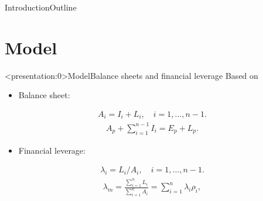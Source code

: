 \documentclass{beamer}
\begin{document}
\begin{frame}{Introduction}{Outline}
  \tableofcontents
\end{frame}
\section{Model}
\begin{frame}<presentation:0>{Model}{Balance sheets and financial leverage}
Based on \cite*{huizinga2008capital}
\begin{itemize}
	\item  Balance sheet:
\end{itemize}
\begin{equation}
\begin{aligned}
A_i=I_i+L_i, \quad i=1,...,n-1.
\end{aligned}
\label{eq:sub balance sheet}
\end{equation}
\begin{equation}
\begin{aligned}
A_p+\sum_{i=1}^{n-1}I_i=E_p+L_p. 
\end{aligned}
\label{eq:parent balance sheet}
\end{equation}
\begin{itemize}
	\item  Financial leverage:
\end{itemize}
\begin{equation*}
\begin{aligned}
\lambda_i=L_i/A_i, \quad i=1,...,n-1.
\end{aligned}
\label{eq:sub leverage}
\end{equation*}
\begin{equation}
\begin{aligned}
\lambda_m=\frac{\sum_{i=1}^{n}L_i}{\sum_{i=1}^{n}A_i}=\sum_{i=1}^{n}\lambda_i\rho_i, 
\end{aligned}
\label{eq:total leverage}
\end{equation} 
\end{frame}
\end{document}
